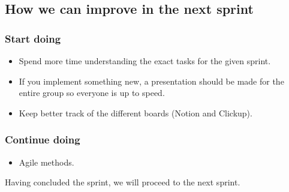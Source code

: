 \subsection{How we can improve in the next sprint}
\subsubsection{Start doing}
\begin{itemize}
    \item Spend more time understanding the exact tasks for the given sprint.
    \item If you implement something new, a presentation should be made for the entire group so everyone is up to speed.
    \item Keep better track of the different boards (Notion and Clickup).
\end{itemize}
\subsubsection{Continue doing}
\begin{itemize}
    \item Agile methods.
\end{itemize}

Having concluded the sprint, we will proceed to the next sprint.
